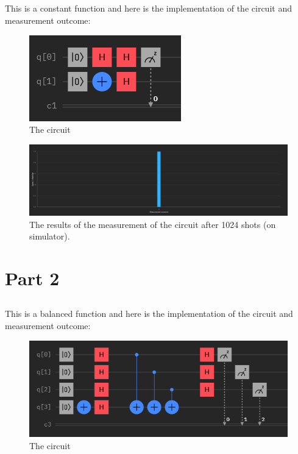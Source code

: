 \documentclass[12pt]{article}
\begin{document}
\newpage

\subsection*{}

This is a constant function and here is the implementation of the circuit and measurement outcome:

\begin{figure}[H]
    \centering
    \includegraphics[scale=0.9]{1d.png}
    \caption{The circuit}
\end{figure}

\begin{figure}[H]
    \centering
    \includegraphics[scale=0.27]{1dr.png}
    \caption{The results of the measurement of the circuit after 1024 shots (on simulator).}
\end{figure}

\newpage

\section*{Part 2}

\subsection*{}

This is a balanced function and here is the implementation of the circuit and measurement outcome:

\begin{figure}[H]
    \centering
    \includegraphics[scale=0.9]{2a.png}
    \caption{The circuit}
\end{figure}
\end{document}
